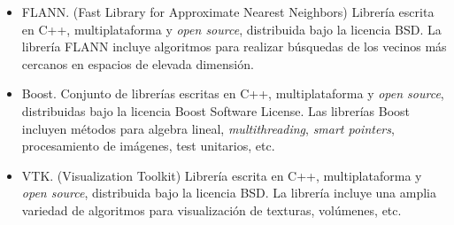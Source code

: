 \begin{itemize}
\item FLANN. (Fast Library for Approximate Nearest Neighbors) Librería escrita en C++, multiplataforma y \textit{open source}, distribuida bajo la licencia BSD. La librería FLANN incluye algoritmos para realizar búsquedas de los vecinos más cercanos en espacios de elevada dimensión.

\item Boost. Conjunto de librerías escritas en C++, multiplataforma y \textit{open source}, distribuidas bajo la licencia Boost Software License. Las librerías Boost incluyen métodos para algebra lineal, \textit{multithreading}, \textit{smart pointers}, procesamiento de imágenes, test unitarios, etc.

\item VTK. (Visualization Toolkit) Librería escrita en C++, multiplataforma y \textit{open source}, distribuida bajo la licencia BSD. La librería incluye una amplia variedad de algoritmos para visualización de texturas, volúmenes, etc.

\end{itemize}

